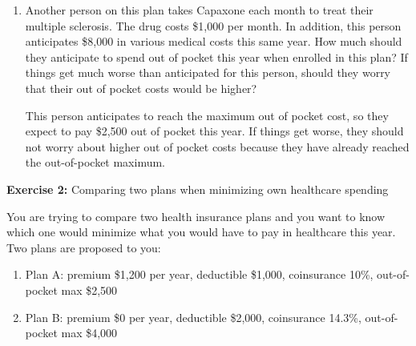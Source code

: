\documentclass[12pt]{article}
\begin{document}
\begin{enumerate}
    \item[4.] Another person on this plan takes Capaxone each month to treat their multiple sclerosis. The drug costs \$1,000 per month.
    In addition, this person anticipates \$8,000 in various medical costs this same year.
    How much should they anticipate to spend out of pocket this year when enrolled in this plan?
    If things get much worse than anticipated for this person,
    should they worry that their out of pocket costs would be higher?


    \vspace{3mm}
    { \color{darkblue}

    This person anticipates to reach the maximum out of pocket cost, so they expect to pay \$2,500 out of pocket this year.
    If things get worse, they should not worry about higher out of pocket costs because they have already reached the out-of-pocket maximum.
    }

\end{enumerate}

\vspace{1em}

\textbf{Exercise 2:} Comparing two plans when minimizing own healthcare spending

You are trying to compare two health insurance plans and you want to know which one would minimize what you would have to pay in healthcare this year.
Two plans are proposed to you:
\begin{enumerate}
    \item Plan A: premium \$1,200 per year, deductible \$1,000, coinsurance 10\%, out-of-pocket max \$2,500
    \item Plan B: premium \$0 per year, deductible \$2,000, coinsurance 14.3\%, out-of-pocket max \$4,000
\end{enumerate}
\vspace{3mm}
\end{document}
